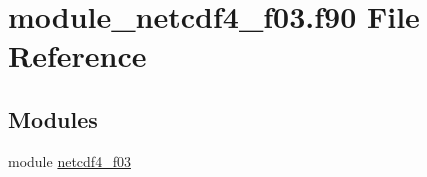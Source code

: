 \hypertarget{module__netcdf4__f03_8f90}{}\section{module\+\_\+netcdf4\+\_\+f03.\+f90 File Reference}
\label{module__netcdf4__f03_8f90}
\subsection*{Modules}
\begin{DoxyCompactItemize}
\item 
module \hyperlink{namespacenetcdf4__f03}{netcdf4\+\_\+f03}
\end{DoxyCompactItemize}
